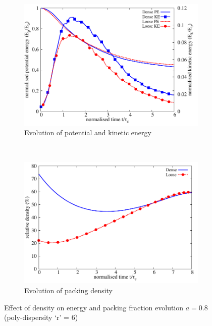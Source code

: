 \begin{figure}[tbhp]
\centering
\begin{subfigure}[b]{0.75\textwidth}
\centering
\includegraphics[width=\textwidth]{Energy_dense_r6}
\caption{Evolution of potential and kinetic energy}
\label{fig:Energy_dense_r6}
\end{subfigure}
\\
\begin{subfigure}[b]{0.75\textwidth}
\centering
\includegraphics[width=\textwidth]{voro_r6}
\caption{Evolution of packing density}
\label{fig:voro_r6}
\end{subfigure}
\caption{Effect of density on energy and packing fraction evolution $a = 
0.8$ 
(poly-dispersity `r' = 6)}
\label{fig:Energy_voro_r6}
\end{figure}

